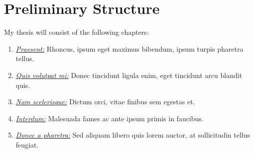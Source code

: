 \section*{Preliminary Structure}
My thesis will consist of the following chapters:
\begin{enumerate}
\itemsep0em 
  \item \underline{\emph{Praesent:}} Rhoncus, ipsum eget maximus bibendum, ipsum turpis pharetra tellus.
  \item \underline{\emph{Quis volutpat mi:}} Donec tincidunt ligula enim, eget tincidunt arcu blandit quis.
  \item \underline{\emph{Nam scelerisque:}} Dictum orci, vitae finibus sem egestas et.
  \item \underline{\emph{Interdum:}} Malesuada fames ac ante ipsum primis in faucibus.
  \item \underline{\emph{Donec a pharetra:}} Sed aliquam libero quis lorem auctor, at sollicitudin tellus feugiat.
\end{enumerate}